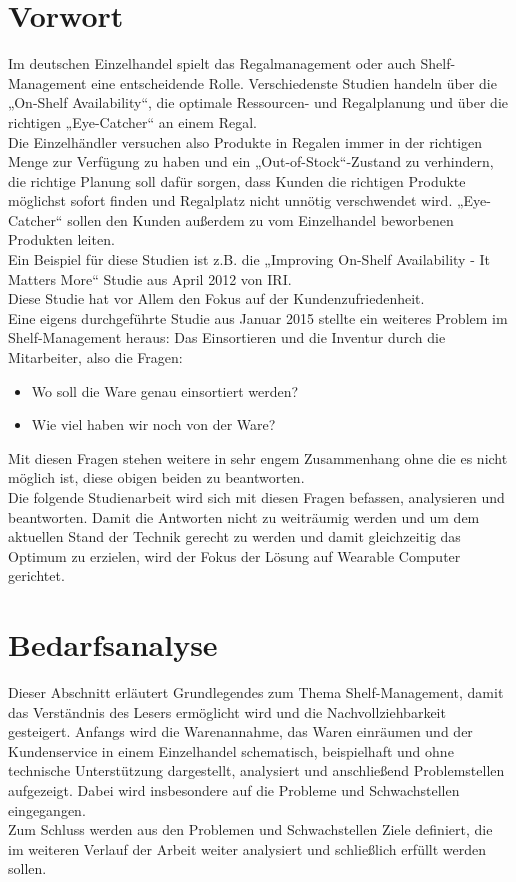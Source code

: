 \chapter{Vorwort}
\label{cha:vorwort}
Im deutschen Einzelhandel spielt das Regalmanagement oder auch Shelf-Management eine entscheidende Rolle. Verschiedenste Studien handeln über die „On-Shelf Availability“, die optimale Ressourcen- und Regalplanung und über die richtigen „Eye-Catcher“ an einem Regal.
\\
Die Einzelhändler versuchen also Produkte in Regalen immer in der richtigen Menge zur Verfügung zu haben und ein „Out-of-Stock“-Zustand zu verhindern, die richtige Planung soll dafür sorgen, dass Kunden die richtigen Produkte möglichst sofort finden und Regalplatz nicht unnötig verschwendet wird. „Eye-Catcher“ sollen den Kunden außerdem zu vom Einzelhandel beworbenen Produkten leiten.
\\
Ein Beispiel für diese Studien ist z.B. die „Improving On-Shelf Availability - It Matters More“  Studie aus April 2012 von IRI.
\\
Diese Studie hat vor Allem den Fokus auf der Kundenzufriedenheit. 
\\
Eine eigens durchgeführte Studie aus Januar 2015 stellte ein weiteres Problem im Shelf-Management heraus: Das Einsortieren und die Inventur durch die Mitarbeiter, also die Fragen:
\begin{itemize}
	\item Wo soll die Ware genau einsortiert werden?
	\item Wie viel haben wir noch von der Ware?
\end{itemize}
Mit diesen Fragen stehen weitere in sehr engem Zusammenhang ohne die es nicht möglich ist, diese obigen beiden zu beantworten. 
\\
Die folgende Studienarbeit wird sich mit diesen Fragen befassen, analysieren und beantworten. Damit die Antworten nicht zu weiträumig werden und um dem aktuellen Stand der Technik gerecht zu werden und damit gleichzeitig das Optimum zu erzielen, wird der Fokus der Lösung auf Wearable Computer gerichtet. 

\chapter{Bedarfsanalyse}
\label{cha:bedarfsanalyse}
Dieser Abschnitt erläutert Grundlegendes zum Thema Shelf-Management, damit das Verständnis des Lesers ermöglicht wird und die Nachvollziehbarkeit gesteigert. Anfangs wird die Warenannahme, das Waren einräumen und der Kundenservice in einem Einzelhandel schematisch, beispielhaft und ohne technische Unterstützung dargestellt, analysiert und anschließend Problemstellen aufgezeigt. Dabei wird insbesondere auf die Probleme und Schwachstellen eingegangen.
\\
Zum Schluss werden aus den Problemen und Schwachstellen Ziele definiert, die im weiteren Verlauf der Arbeit weiter analysiert und schließlich erfüllt werden sollen.
